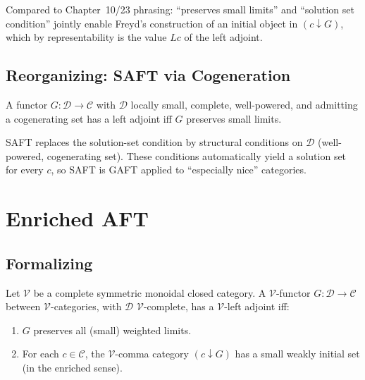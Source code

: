 \begin{remark}
Compared to Chapter~10/23 phrasing: ``preserves small limits'' and ``solution
set condition'' jointly enable Freyd's construction of an initial object in
$(c \downarrow G)$, which by representability is the value $L c$ of the
left adjoint.
\end{remark}

\subsection{Reorganizing: SAFT via Cogeneration}

\begin{theorem}
\label{thm:saft-yoneda}
A functor $G : \mathcal{D} \to \mathcal{C}$ with $\mathcal{D}$ locally small,
complete, well-powered, and admitting a cogenerating set has a left adjoint
iff $G$ preserves small limits.
\end{theorem}

\begin{remark}
SAFT replaces the solution-set condition by structural conditions on
$\mathcal{D}$ (well-powered, cogenerating set). These conditions automatically
yield a solution set for every $c$, so SAFT is GAFT applied to
``especially nice'' categories.
\end{remark}


\section{Enriched AFT}
\label{sec:enriched-aft}

\subsection{Formalizing}

\begin{theorem}
\label{thm:enriched-gaft}
Let $\mathcal{V}$ be a complete symmetric monoidal closed category. A
$\mathcal{V}$-functor $G : \mathcal{D} \to \mathcal{C}$ between $\mathcal{V}$-categories,
with $\mathcal{D}$ $\mathcal{V}$-complete, has a $\mathcal{V}$-left adjoint
iff:
\begin{enumerate}
  \item $G$ preserves all (small) weighted limits.
  \item For each $c \in \mathcal{C}$, the $\mathcal{V}$-comma category
        $(c \downarrow G)$ has a small weakly initial set (in the enriched
        sense).
\end{enumerate}
\end{theorem}

